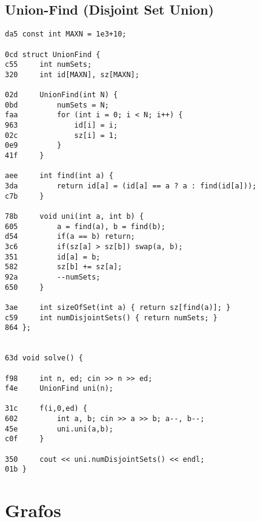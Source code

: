 \documentclass[11pt, a4paper, twoside]{article}
\begin{document}
\subsection{Union-Find (Disjoint Set Union)}
\begin{lstlisting}
da5 const int MAXN = 1e3+10;

0cd struct UnionFind {
c55     int numSets;
320     int id[MAXN], sz[MAXN];
    
02d     UnionFind(int N) {
0bd         numSets = N;
faa         for (int i = 0; i < N; i++) {
963             id[i] = i;
02c             sz[i] = 1;
0e9         }
41f     }
    
aee     int find(int a) { 
3da         return id[a] = (id[a] == a ? a : find(id[a]));
c7b     }
    
78b     void uni(int a, int b) { 
605         a = find(a), b = find(b);
d54         if(a == b) return;
3c6         if(sz[a] > sz[b]) swap(a, b);
351         id[a] = b;
582         sz[b] += sz[a];
92a         --numSets;
650     }
        
3ae     int sizeOfSet(int a) { return sz[find(a)]; }
c59     int numDisjointSets() { return numSets; }
864 };


63d void solve() {
    
f98 	int n, ed; cin >> n >> ed;
f4e 	UnionFind uni(n);
    
31c 	f(i,0,ed) {
602 		int a, b; cin >> a >> b; a--, b--;
45e 		uni.uni(a,b);
c0f 	}
    
350 	cout << uni.numDisjointSets() << endl;
01b }
\end{lstlisting}



%
%

\section{Grafos}
\end{document}
